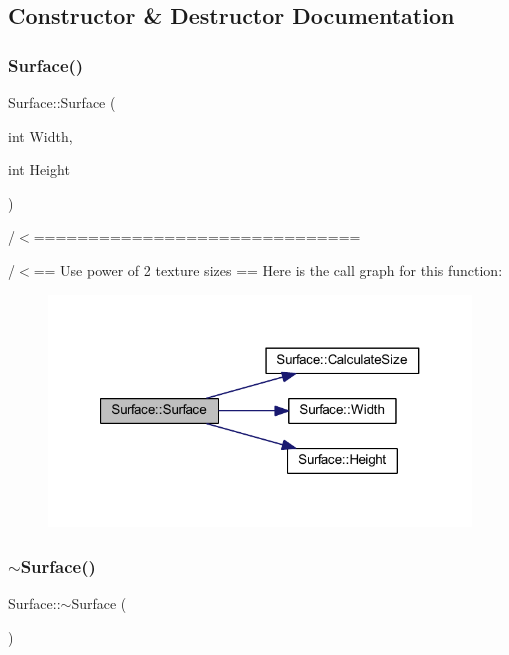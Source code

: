 \subsection{Constructor \& Destructor Documentation}
\mbox{\label{class_surface_a323ba9165c8635e84eb0c490fe88d846}} 
\subsubsection{\texorpdfstring{Surface()}{Surface()}}
{\footnotesize\ttfamily Surface\+::\+Surface (\begin{DoxyParamCaption}\item[{int}]{Width,  }\item[{int}]{Height }\end{DoxyParamCaption})}



/$<$============================== 

/$<$== Use power of 2 texture sizes == Here is the call graph for this function\+:\nopagebreak
\begin{figure}[H]
\begin{center}
\leavevmode
\includegraphics[width=321pt]{class_surface_a323ba9165c8635e84eb0c490fe88d846_cgraph}
\end{center}
\end{figure}
\mbox{\label{class_surface_a89de75c95cb550d432f3ea4ed1429db0}} 
\subsubsection{\texorpdfstring{$\sim$\+Surface()}{~Surface()}}
{\footnotesize\ttfamily Surface\+::$\sim$\+Surface (\begin{DoxyParamCaption}{ }\end{DoxyParamCaption})}




